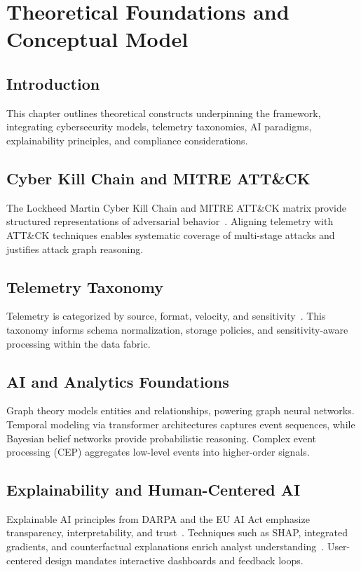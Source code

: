\chapter{Theoretical Foundations and Conceptual Model}\label{chap:theory}
\section{Introduction}
This chapter outlines theoretical constructs underpinning the framework, integrating cybersecurity models, telemetry taxonomies, AI paradigms, explainability principles, and compliance considerations.

\section{Cyber Kill Chain and MITRE ATT\&CK}
The Lockheed Martin Cyber Kill Chain and MITRE ATT\&CK matrix provide structured representations of adversarial behavior~\cite{hutchins2011killchain,mitreattack2023}. Aligning telemetry with ATT\&CK techniques enables systematic coverage of multi-stage attacks and justifies attack graph reasoning.

\section{Telemetry Taxonomy}
Telemetry is categorized by source, format, velocity, and sensitivity~\cite{opentelemetry2023}. This taxonomy informs schema normalization, storage policies, and sensitivity-aware processing within the data fabric.

\section{AI and Analytics Foundations}
Graph theory models entities and relationships, powering graph neural networks. Temporal modeling via transformer architectures captures event sequences, while Bayesian belief networks provide probabilistic reasoning. Complex event processing (CEP) aggregates low-level events into higher-order signals.

\section{Explainability and Human-Centered AI}
Explainable AI principles from DARPA and the EU AI Act emphasize transparency, interpretability, and trust~\cite{darpa2020xai,nis22022}. Techniques such as SHAP, integrated gradients, and counterfactual explanations enrich analyst understanding~\cite{lundberg2017shap,ribeiro2016lime}. User-centered design mandates interactive dashboards and feedback loops.

